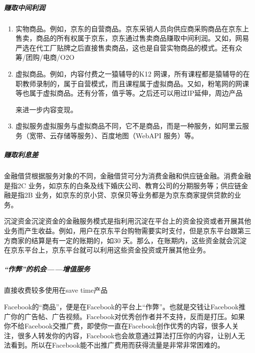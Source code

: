 \documentclass[letterpaper,11pt,english]{sphinxmanual}
\begin{document}
\subparagraph{赚取中间利润}
\label{\detokenize{chapter_introduction/money:id12}}\begin{enumerate}
%
\item {} 
实物商品。例如，京东的自营商品。京东采销人员向供应商采购商品在京东上售卖，商品的所有权属于京东，京东通过售卖商品赚取中间利润。又如，网易严选在代工厂贴牌之后直接售卖商品，这也是自营实物商品的模式。还有众筹/团购/电商/O2O%
\begin{footnote}[114]\sphinxAtStartFootnote
{}
%
\end{footnote}

\item {} 
虚拟商品。例如，内容付费之一猿辅导的K12
网课，所有课程都是猿辅导的在职教师录制的，属于自营模式，而且课程属于虚拟商品。又如，粉笔网的网课等也属于虚拟商品。还有分答，值乎等。之后还可以用过IP延伸，周边产品%
\begin{footnote}[115]\sphinxAtStartFootnote
{}
%
\end{footnote}来进一步内容变现。

\item {} 
虚拟服务虚拟服务与虚拟商品不同，它不是商品，而是一种服务，如阿里云服务（宽带、云存储等服务）、百度地图（WebAPI
服务）等。

\end{enumerate}


\subparagraph{赚取利息差}
\label{\detokenize{chapter_introduction/money:id13}}
金融借贷根据服务对象的不同，金融借贷可分为消费金融和供应链金融。消费金融是指2C
业务，如京东的白条及线下婚庆公司、教育公司的分期服务等；供应链金融是指2B
业务，如京东的京小贷、京保贝等业务都是为京东商家提供贷款的业务。

沉淀资金沉淀资金的金融服务模式是指利用沉淀在平台上的资金投资或者开展其他业务而产生收益。例如，用户在京东平台购物需要实时支付，但是京东平台跟第三方商家的结算是有一定的账期的，如30
天。那么，在账期内，这些资金就会沉淀在京东平台上，京东平台就可以利用这些资金投资或开展其他业务。


\subparagraph{“作弊”的机会——增值服务}
\label{\detokenize{chapter_introduction/money:id14}}
直接收费较多使用在save time产品

Facebook的“商品”，便是在Facebook的平台上“作弊”。也就是交钱让Facebook推广你的广告帖、广告视频。Facebook对优秀创作者并不支持，反而是打压。如果你不给Facebook交推广费，即使你一直在Facebook创作优秀的内容，很多人关注，很多人转发你的内容，Facebook也会故意通过算法打压你的内容，让别人无法看到。所以在Facebook能不出推广费用而获得流量是非常非常困难的。
\end{document}
